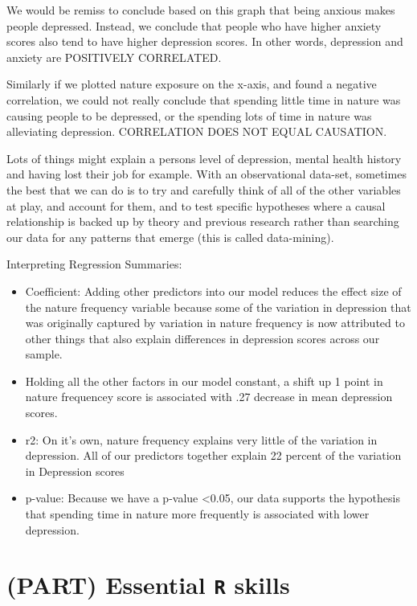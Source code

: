 \documentclass[
]{book}
\providecommand{\tightlist}{%
  \setlength{\itemsep}{0pt}\setlength{\parskip}{0pt}}
\begin{document}
We would be remiss to conclude based on this graph that being anxious makes people depressed. Instead, we conclude that people who have higher anxiety scores also tend to have higher depression scores. In other words, depression and anxiety are POSITIVELY CORRELATED.

Similarly if we plotted nature exposure on the x-axis, and found a negative correlation, we could not really conclude that spending little time in nature was causing people to be depressed, or the spending lots of time in nature was alleviating depression. CORRELATION DOES NOT EQUAL CAUSATION.

Lots of things might explain a persons level of depression, mental health history and having lost their job for example. With an observational data-set, sometimes the best that we can do is to try and carefully think of all of the other variables at play, and account for them, and to test specific hypotheses where a causal relationship is backed up by theory and previous research rather than searching our data for any patterns that emerge (this is called data-mining).

Interpreting Regression Summaries:

\begin{itemize}
\tightlist
\item
  Coefficient: Adding other predictors into our model reduces the effect size of the nature frequency variable because some of the variation in depression that was originally captured by variation in nature frequency is now attributed to other things that also explain differences in depression scores across our sample.
\item
  Holding all the other factors in our model constant, a shift up 1 point in nature frequencey score is associated with .27 decrease in mean depression scores.
\item
  r2: On it's own, nature frequency explains very little of the variation in depression. All of our predictors together explain 22 percent of the variation in Depression scores
\item
  p-value: Because we have a p-value \textless0.05, our data supports the hypothesis that spending time in nature more frequently is associated with lower depression.
\end{itemize}

\hypertarget{part-essential-r-skills}{%
\chapter*{\texorpdfstring{(PART) Essential \texttt{R} skills}{(PART) Essential R skills}}\label{part-essential-r-skills}}
\end{document}
